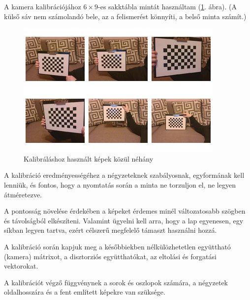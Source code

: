 

A kamera kalibrációjához $6 \times 9$-es sakktábla mintát használtam (\ref{fig:calibration}. ábra). (A külső sáv nem számolandó bele, az a felismerést könnyíti, a belső minta számít.)

\begin{figure}[htp]
	\centering
	\includegraphics[scale=1]{images/calibration.jpg}
	\caption{Kalibráláshoz használt képek közül néhány}
	\label{fig:calibration}
\end{figure}

A kalibráció eredményességéhez a négyzeteknek szabályosnak, egyformának kell lenniük, és fontos, hogy a nyomtatás során a minta ne torzuljon el, ne legyen átméretezve.

A pontosság növelése érdekében a képeket érdemes minél változatosabb szögben és távolságból elkészíteni. Valamint ügyelni kell arra, hogy a lap egyenesen, egy síkban legyen tartva, ezért célszerű megfelelő támaszt használni hozzá.

A kalibráció során kapjuk meg a későbbiekben nélkülözhetetlen együttható (kamera) mátrixot, a disztorziós együtthatókat, az eltolási és forgatási vektorokat.

A kalibrációt végző függvénynek a sorok és oszlopok számára, a négyzetek oldalhosszára és a fent említett képekre van szüksége.

